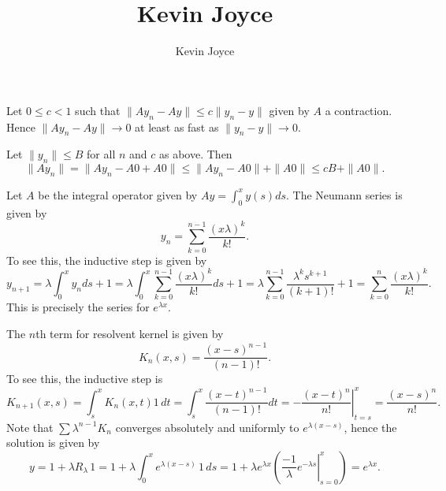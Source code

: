 \documentclass{homework}
\title{Kevin Joyce}
\author{Kevin Joyce}
\begin{document}
 
\newcommand{\figref}[1]{\figurename~\ref{#1}}
\renewcommand{\bar}{\overline}
\renewcommand{\hat}{\widehat}
\renewcommand{\SS}{\mathcal S}
\renewcommand{\NN}{\mathcal N}
\newcommand{\DD}{\mathcal D}
\newcommand{\eps}{\varepsilon}
\newcommand{\TTheta}{\overline{\underline \Theta} }
\newcommand{\del}{\partial}
\newcommand{\approxsim}{\overset{\cdotp}{\underset{\cdotp}{\sim}}}


\begin{solution}[(a)]
  Let $0\le c < 1$  such that $\|Ay_n - Ay\| \le c\|y_n - y\|$ given by $A$ a contraction.  Hence $\|Ay_n - Ay\| \to 0$ at least as fast as $\|y_n - y\|\to 0$.
\end{solution}

\begin{solution}[(b)]
  Let $\|y_n\| \le B$ for all $n$ and $c$ as above.  Then 
  $$
    \|Ay_n\| = \|Ay_n -A0 + A0\| \le \|Ay_n - A0\| + \|A0\| \le cB + \|A0\|.
  $$
\end{solution}


\begin{solution}
  Let $A$ be the integral operator given by $Ay = \int_0^x y(s)ds$. The Neumann series is given by 
  $$
    y_n = \sum_{k=0}^{n-1} \frac{(x\lambda)^k}{k!}.
  $$
  To see this, the inductive step is given by
  $$
    y_{n+1} = \lambda \int_0^x y_n ds + 1 = \lambda \int_0^x \sum_{k=0}^{n-1} \frac{(x\lambda)^k}{k!}ds + 1 = \lambda \sum_{k=0}^{n-1} \frac{\lambda^k s^{k+1}}{(k+1)!} + 1 = \sum_{k=0}^n \frac{(x\lambda)^k}{k!}.
  $$
  This is precisely the series for $e^{\lambda x}$.
\end{solution}


\begin{solution}
  The $n$th term for resolvent kernel is given by
  $$
    K_n(x,s) = \frac{(x-s)^{n-1}}{(n-1)!}.
  $$
  To see this, the inductive step is 
  $$
    K_{n+1}(x,s) = \int_s^x K_n(x,t) 1\,dt = \int_s^x \frac{(x-t)^{n-1}}{(n-1)!}dt = \left.-\frac{(x-t)^{n}}{n!}\right|_{t=s}^x = \frac{(x-s)^{n}}{n!}.
  $$
  Note that $\sum \lambda^{n-1} K_n$ converges absolutely and uniformly to $e^{\lambda(x-s)}$, hence the solution is given by
  $$
    y = 1 + \lambda R_\lambda\,1 = 1 + \lambda \int_0^x e^{\lambda(x-s)}\,1\,ds = 1 + \lambda e^{\lambda x} \left(\left.\frac {-1}\lambda e^{-\lambda s}\right|_{s=0}^x\right) = e^{\lambda x}.
  $$
\end{solution}
\end{document}
